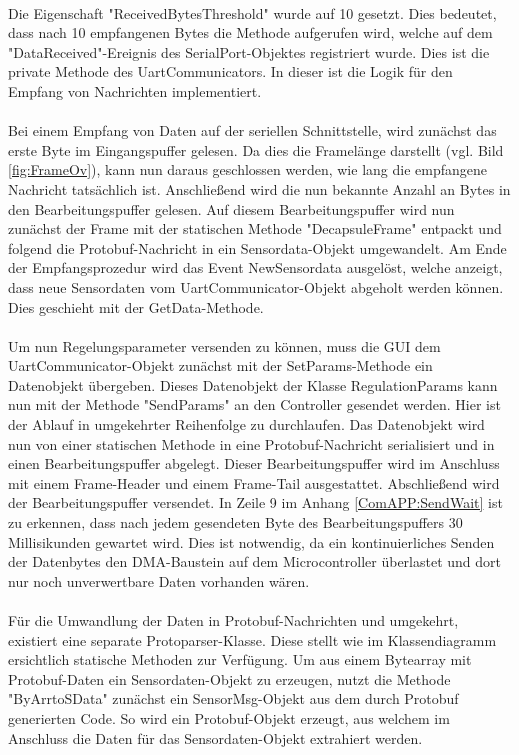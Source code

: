 \paragraph{}
Die Eigenschaft "ReceivedBytesThreshold" wurde auf 10 gesetzt. Dies bedeutet, dass nach 10 empfangenen Bytes die Methode aufgerufen wird, welche auf dem "DataReceived"-Ereignis des SerialPort-Objektes registriert wurde. Dies ist die private Methode des UartCommunicators. In dieser ist die Logik für den Empfang von Nachrichten implementiert.
\paragraph{}
Bei einem Empfang von Daten auf der seriellen Schnittstelle, wird zunächst das erste Byte im Eingangspuffer gelesen. Da dies die Framelänge darstellt (vgl. Bild \ref{fig:FrameOv}), kann nun daraus geschlossen werden, wie lang die empfangene Nachricht tatsächlich ist. Anschließend wird die nun bekannte Anzahl an Bytes in den Bearbeitungspuffer gelesen. Auf diesem Bearbeitungspuffer wird nun zunächst der Frame mit der statischen Methode "DecapsuleFrame" entpackt und folgend die Protobuf-Nachricht in ein Sensordata-Objekt umgewandelt. Am Ende der Empfangsprozedur wird das Event NewSensordata ausgelöst, welche anzeigt, dass neue Sensordaten vom UartCommunicator-Objekt abgeholt werden können. Dies geschieht mit der GetData-Methode.
\paragraph{}
Um nun Regelungsparameter versenden zu können, muss die GUI dem UartCommunicator-Objekt zunächst mit der SetParams-Methode ein Datenobjekt übergeben. Dieses Datenobjekt der Klasse RegulationParams kann nun mit der Methode "SendParams" an den Controller gesendet werden. Hier ist der Ablauf in umgekehrter Reihenfolge zu durchlaufen. Das Datenobjekt wird nun von einer statischen Methode in eine Protobuf-Nachricht serialisiert und in einen Bearbeitungspuffer abgelegt. Dieser Bearbeitungspuffer wird im Anschluss mit einem Frame-Header und einem Frame-Tail ausgestattet. Abschließend wird der Bearbeitungspuffer versendet. In Zeile 9 im Anhang \ref{ComAPP:SendWait} ist zu erkennen, dass nach jedem gesendeten Byte des Bearbeitungspuffers 30 Millisikunden gewartet wird. Dies ist notwendig, da ein kontinuierliches Senden der Datenbytes den DMA-Baustein auf dem Microcontroller überlastet und dort nur noch unverwertbare Daten vorhanden wären.
\paragraph{}
Für die Umwandlung der Daten in Protobuf-Nachrichten und umgekehrt, existiert eine separate Protoparser-Klasse. Diese stellt wie im Klassendiagramm ersichtlich statische Methoden zur Verfügung. Um aus einem Bytearray mit Protobuf-Daten ein Sensordaten-Objekt zu erzeugen, nutzt die Methode "ByArrtoSData" zunächst ein SensorMsg-Objekt aus dem durch Protobuf generierten Code. So wird ein Protobuf-Objekt erzeugt, aus welchem im Anschluss die Daten für das Sensordaten-Objekt extrahiert werden.
